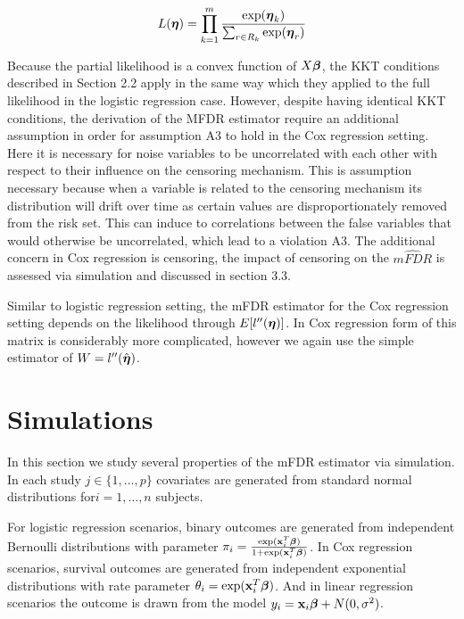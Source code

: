 \begin{equation*}
L(\boldsymbol{\eta})  = \prod_{k=1}^{m} \frac{\exp(\boldsymbol{\eta}_k)}{\sum_{r \in R_k} \exp(\boldsymbol{\eta}_r) } 
\end{equation*}

Because the partial likelihood is a convex function of $X\boldsymbol{\beta}$, the KKT conditions described in Section 2.2 apply in the same way which they applied to the full likelihood in the logistic regression case. However, despite having identical KKT conditions, the derivation of the MFDR estimator require an additional assumption in order for assumption A3 to hold in the Cox regression setting.  Here it is necessary for noise variables to be uncorrelated with each other with respect to their influence on the censoring mechanism. This is assumption necessary because when a variable is related to the censoring mechanism its distribution will drift over time as certain values are disproportionately removed from the risk set. This can induce to correlations between the false variables that would otherwise be uncorrelated, which lead to a violation A3. The additional concern in Cox regression is censoring, the impact of censoring on the $\widehat{mFDR}$ is assessed via simulation and discussed in section 3.3. 

Similar to logistic regression setting, the mFDR estimator for the Cox regression setting depends on the likelihood through $E[l''(\boldsymbol{\eta})]$.  In Cox regression form of this matrix is considerably more complicated, however we again use the simple estimator of $W =  l''(\hat{\boldsymbol{\eta}})$.

\section{Simulations}

In this section we study several properties of the mFDR estimator via simulation. In each study $j \in \{1, \ldots, p\}$ covariates are generated from standard normal distributions for$i = 1, \ldots, n$ subjects. 

For logistic regression scenarios, binary outcomes are generated from independent Bernoulli distributions with parameter $\pi_i = \frac{\exp(\mathbf{x}_i^T \boldsymbol{\beta})} {1 + \exp(\mathbf{x}_i^T \boldsymbol{\beta})}$. In Cox regression scenarios, survival outcomes are generated from independent exponential distributions with rate parameter $\theta_i = \exp(\mathbf{x}_i^T \boldsymbol{\beta})$. And in linear regression scenarios the outcome is drawn from the model $y_i = \mathbf{x}_i\boldsymbol{\beta} + N(0,\sigma^2)$.

